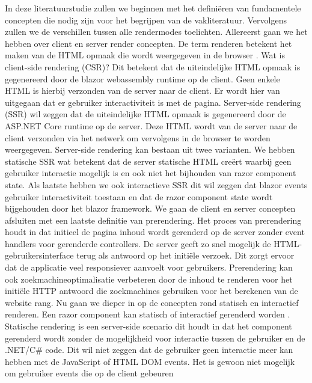 \documentclass{hogent-article}
\begin{document}
In deze literatuurstudie zullen we beginnen met het definiëren van fundamentele concepten die nodig zijn voor het begrijpen van de vakliteratuur. Vervolgens zullen we de verschillen
tussen alle rendermodes toelichten. Allereerst gaan we het hebben over client en server render concepten. De term renderen betekent het maken van de 
HTML opmaak die wordt weergegeven in de browser \autocite{Guardrex2023}.  Wat is client-side rendering (CSR)? Dit betekent dat de uiteindelijke HTML opmaak is 
gegenereerd door de blazor webassembly runtime op de client. Geen enkele HTML is hierbij verzonden van de server naar de client. Er wordt hier van uitgegaan dat er 
gebruiker interactiviteit is met de pagina. \autocite{Guardrex2023} Server-side rendering (SSR) wil zeggen dat de uiteindelijke HTML opmaak is gegenereerd door de ASP.NET Core runtime
op de server. Deze HTML wordt van de server naar de client verzonden via het netwerk om vervolgens in de browser te worden weergegeven. Server-side rendering kan bestaan uit twee
varianten. We hebben statische SSR wat betekent dat de server statische HTML creërt waarbij geen gebruiker interactie mogelijk is en ook niet het bijhouden van razor component state.
Als laatste hebben we ook interactieve SSR dit wil zeggen dat blazor events gebruiker interactiviteit toestaan en dat de razor component state wordt bijgehouden door het blazor framework. \autocite{Guardrex2023}
We gaan de client en server concepten afsluiten met een laatste definitie van prerendering. Het proces van prerendering houdt in dat initieel de pagina inhoud wordt gerenderd op de server zonder event handlers voor gerenderde controllers.
De server geeft zo snel mogelijk de HTML-gebruikersinterface terug als antwoord op het initiële verzoek. Dit zorgt ervoor dat de applicatie veel responsiever aanvoelt voor gebruikers.
Prerendering kan ook zoekmachineoptimalisatie verbeteren door de inhoud te renderen voor het initiële HTTP antwoord die zoekmachines gebruiken voor het berekenen van de website rang. \autocite{Guardrex2023}
Nu gaan we dieper in op de concepten rond statisch en interactief renderen. Een razor component kan statisch of interactief gerenderd worden \autocite{Guardrex2023}.
Statische rendering is een server-side scenario dit houdt in dat het component gerenderd wordt zonder de mogelijkheid voor interactie tussen de gebruiker en de .NET/C\# code.
Dit wil niet zeggen dat de gebruiker geen interactie meer kan hebben met de JavaScript of HTML DOM events. Het is gewoon niet mogelijk om gebruiker events die op de client gebeuren
\end{document}
